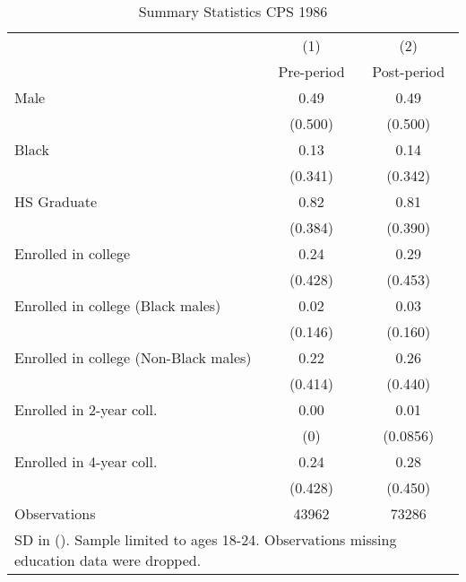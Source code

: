 \begin{table}[htbp]\centering
\caption{Summary Statistics CPS 1986}
\begin{tabular}{l*{2}{c}}
\hline\hline
                    &\multicolumn{1}{c}{(1)}&\multicolumn{1}{c}{(2)}\\
                    &\multicolumn{1}{c}{Pre-period}&\multicolumn{1}{c}{Post-period}\\
\hline
Male                &        0.49&        0.49\\
                    &     (0.500)&     (0.500)\\
[1em]
Black               &        0.13&        0.14\\
                    &     (0.341)&     (0.342)\\
[1em]
HS Graduate         &        0.82&        0.81\\
                    &     (0.384)&     (0.390)\\
[1em]
Enrolled in college &        0.24&        0.29\\
                    &     (0.428)&     (0.453)\\
[1em]
Enrolled in college (Black males)&        0.02&        0.03\\
                    &     (0.146)&     (0.160)\\
[1em]
Enrolled in college (Non-Black males)&        0.22&        0.26\\
                    &     (0.414)&     (0.440)\\
[1em]
Enrolled in 2-year coll.&        0.00&        0.01\\
                    &         (0)&    (0.0856)\\
[1em]
Enrolled in 4-year coll.&        0.24&        0.28\\
                    &     (0.428)&     (0.450)\\
\hline
Observations        &       43962&       73286\\
\hline\hline
\multicolumn{3}{l}{\footnotesize SD in (). Sample limited to ages 18-24. Observations missing education data were dropped.}\\
\end{tabular}
\end{table}
